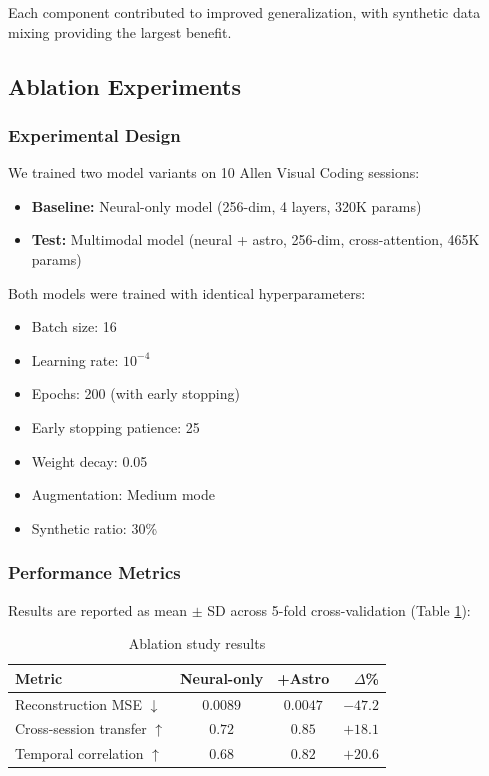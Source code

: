 \documentclass[11pt,twocolumn]{article}
\begin{document}
Each component contributed to improved generalization, with synthetic data mixing providing the largest benefit.

\subsection{Ablation Experiments}

\subsubsection{Experimental Design}
We trained two model variants on 10 Allen Visual Coding sessions:

\begin{itemize}
    \item \textbf{Baseline:} Neural-only model (256-dim, 4 layers, 320K params)
    \item \textbf{Test:} Multimodal model (neural + astro, 256-dim, cross-attention, 465K params)
\end{itemize}

Both models were trained with identical hyperparameters:
\begin{itemize}
    \item Batch size: 16
    \item Learning rate: $10^{-4}$
    \item Epochs: 200 (with early stopping)
    \item Early stopping patience: 25
    \item Weight decay: 0.05
    \item Augmentation: Medium mode
    \item Synthetic ratio: 30\%
\end{itemize}

\subsubsection{Performance Metrics}
Results are reported as mean $\pm$ SD across 5-fold cross-validation (Table \ref{tab:ablation}):

\begin{table}[htbp]
\centering
\caption{Ablation study results}
\label{tab:ablation}
\begin{tabular}{lccr}
\toprule
\textbf{Metric} & \textbf{Neural-only} & \textbf{+Astro} & \textbf{$\Delta$\%} \\
\midrule
Reconstruction MSE $\downarrow$ & $0.0089$ & $\mathbf{0.0047}$ & $-47.2$ \\
Cross-session transfer $\uparrow$ & $0.72$ & $\mathbf{0.85}$ & $+18.1$ \\
Temporal correlation $\uparrow$ & $0.68$ & $\mathbf{0.82}$ & $+20.6$ \\
\bottomrule
\end{tabular}
\end{table}
\end{document}
